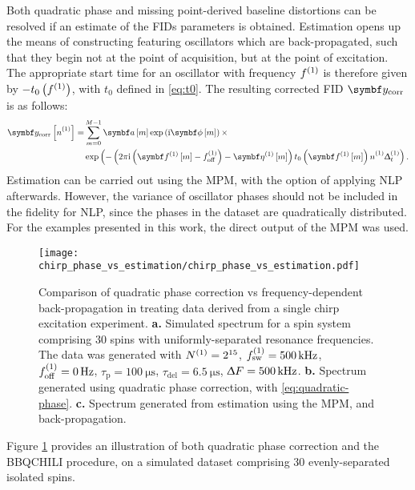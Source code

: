 Both quadratic phase and missing point-derived baseline distortions can be
resolved if an estimate of the \acp{FID} parameters is obtained. Estimation
opens up the means of constructing  featuring oscillators which
are back-propagated, such that they begin not at the point of acquisition, but
at the point of excitation. The appropriate start time for an oscillator with
frequency $f^{(1)}$ is therefore given by $-t_0\left( f^{(1)} \right)$, with  $t_0$
defined in \eqref{eq:t0}. The resulting corrected \ac{FID} $\by_{\text{corr}}$
is as follows:
\begin{equation}
    \begin{split}
        \by_{\text{corr}} \left[ \none \right] =
            &\sum_{m=0}^{M-1} \bdam \exp \left( \iu \bdphim \right) \times \\
            &\exp\left(-
            \left(2 \pi \iu \left(\bdfonem - \foffone \right) - \bdetaonem \right)
            t_0 \left(\bdfonem\right) \none \Dtone
            \right).
    \end{split}
\end{equation}
Estimation can be carried out using the \ac{MPM}, with the option of applying
\ac{NLP} afterwards. However, the variance of oscillator phases should not be
included in the fidelity for \ac{NLP}, since the phases in the dataset are
quadratically distributed. For the examples presented in this work, the direct
output of the \ac{MPM} was used.

\begin{figure}
    \centering
    \texttt{[image: chirp\_phase\_vs\_estimation/chirp\_phase\_vs\_estimation.pdf]}
    \caption[
        Comparison of quadratic phase correction vs frequency-dependent
        back-propagation in treating data derived from a single-chirp
        excitation experiment.
    ]
    {
        Comparison of quadratic phase correction vs frequency-dependent
        back-propagation in treating data derived from a single chirp
        excitation experiment.
        \textbf{a.} Simulated spectrum for a spin system comprising 30 spins
        with uniformly-separated resonance frequencies. The data was generated
        with
        $N^{(1)}=2^{15}$,
        $f_{\mathrm{sw}}^{(1)}=\qty{500}{\kilo\hertz}$,
        $f_{\mathrm{off}}^{(1)}=\qty{0}{\hertz}$,
        $\tau_{\text{p}} = \qty{100}{\micro\second}$,
        $\tau_{\text{del}} = \qty{6.5}{\micro\second}$,
        $\Updelta F = \qty{500}{\kilo\hertz}$.
        \textbf{b.} Spectrum generated using quadratic phase correction, with
        \eqref{eq:quadratic-phase}.
        \textbf{c.} Spectrum generated from estimation using the \ac{MPM}, and
        back-propagation.
    }
    \label{fig:chirp-phase-vs-backprop}
\end{figure}
Figure \ref{fig:chirp-phase-vs-backprop} provides an illustration of both
quadratic phase correction and the \ac{BBQCHILI} procedure, on a simulated
dataset comprising 30 evenly-separated isolated spins.


